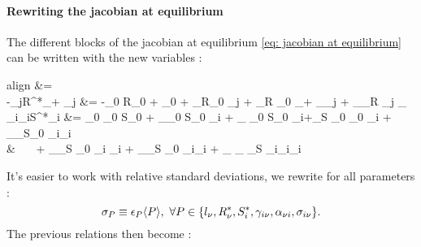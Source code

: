 \documentclass[12pt, titlepage]{report}
\begin{document}
	 \paragraph{Rewriting the jacobian at equilibrium}
	 The different blocks of the jacobian at equilibrium \eqref{eq: jacobian at equilibrium} can be written with the new variables :
	 \begin{empheq}[left=\empheqlbrace]{align}
	  &=  \\
	 -\gamma_{j\mu}R^*_\mu + \alpha_{\mu j} &= -\gamma_0 R_0 + \alpha_0 + \sigma_\gamma R_0 \tilde{\gamma}_{j\mu} + \sigma_R \gamma_0 _\mu + \sigma_\alpha \tilde{\alpha}_{\mu j} + \sigma_\gamma \sigma_R \tilde{\gamma}_{j\mu} _\mu \\
	 \sigma_{i\nu}\gamma_{i\nu}S^*_i &= \sigma_0 \gamma_0 S_0 + \sigma_\sigma \gamma_0 S_0 \tilde{\sigma}_{i\nu} + \sigma_{\gamma} \sigma_0 S_0 \tilde{\gamma}_{i\nu}+\sigma_S \sigma_0 \gamma_0 _i + \sigma_\sigma \sigma_\gamma S_0 \tilde{\sigma}_{i\nu}\tilde{\gamma}_{i\nu} \nonumber \\
	  & \ \ \ + \sigma_\sigma \sigma_S \gamma_0 \tilde{\sigma}_{i\nu} _i + \sigma_\gamma \sigma_S \sigma_0 \tilde{\gamma}_{i\nu}_i + \sigma_{\sigma} \sigma_{\gamma} \sigma_{S} \tilde{\sigma}_{i\nu}\tilde{\gamma}_{i\nu}_i
	 \end{empheq}
	 It's easier to work with relative standard deviations, \ie we rewrite for all parameters :
	 \begin{equation}
	 \sigma_P \equiv \epsilon_P \langle P \rangle, \ \forall P \in\{l_\nu, R^*_\nu, S^*_i, \gamma_{i\nu}, \alpha_{\nu i}, \sigma_{i\nu}\}.
	 \end{equation}
	 The previous relations then become :
\end{document}

